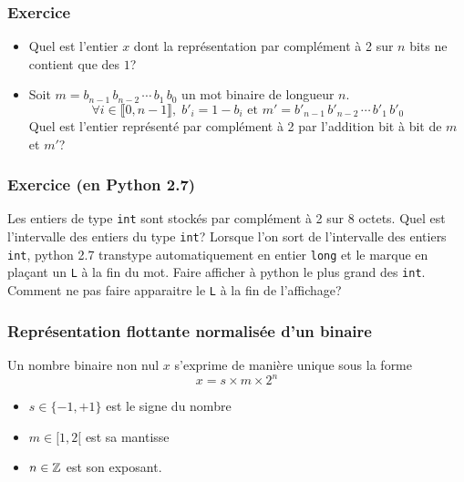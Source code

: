 \begin{frame}
  \frametitle{Exercice}
\begin{itemize}
  \item Quel est l'entier $x$ dont la représentation par complément à 2 sur $n$ bits ne contient que des $1$?
  \item Soit $m = b_{n-1}\,b_{n-2}\,\cdots\,b_1\,b_0$ un mot binaire de longueur $n$.
\begin{displaymath}
  \forall i\in \llbracket 0,n-1\rrbracket, \; b'_i = 1-b_i \text{ et } m' = b'_{n-1}\,b'_{n-2}\,\cdots\,b'_1\,b'_0
\end{displaymath}
  Quel est l'entier représenté par complément à 2 par l'addition bit à bit de $m$ et $m'$? 
\end{itemize}
\end{frame}

\begin{frame}
  \frametitle{Exercice (en Python 2.7)}
Les entiers de type \texttt{int} sont stockés par complément à 2 sur 8 octets. Quel est l'intervalle des entiers du type \texttt{int}?\newline
Lorsque l'on sort de l'intervalle des entiers \texttt{int}, python 2.7 transtype automatiquement en entier \texttt{long} et le marque en plaçant un \texttt{L} à la fin du mot. Faire afficher à python le plus grand des \texttt{int}. Comment ne pas faire apparaitre le \texttt{L} à la fin de l'affichage?
\end{frame}

\begin{frame}
  \frametitle{Représentation flottante normalisée d'un binaire}
Un nombre binaire non nul $x$ s'exprime de manière unique sous la forme
\begin{displaymath}
 x = s\times m\times 2^n 
\end{displaymath}
\begin{itemize}
  \item $s\in\{-1,+1\}$ est le signe du nombre
  \item $m\in [1,2[$ est sa mantisse
  \item $n\in \mathbb{Z}$ est son exposant.  
\end{itemize}
\end{frame}

